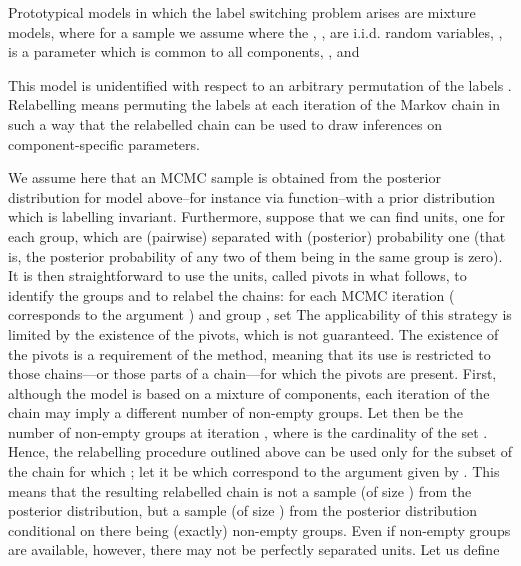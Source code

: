 \documentclass[a4paper]{book}
\begin{document}
\begin{Details}\relax
Prototypical models in which the label switching problem arises are mixture models,
where for a sample  we assume
where the , , are i.i.d. random variables, ,
\eqn{\phi}{} is a parameter which is common to all components,  ,
and

This model is unidentified with respect to an arbitrary permutation of the labels . Relabelling means permuting
the labels at each iteration of the Markov chain in such
a way that the relabelled chain can be used to draw inferences
on component-specific parameters.


We assume here that an MCMC sample is obtained from the
posterior distribution for model above--for instance via
 function--with a prior distribution which is
labelling invariant.
Furthermore, suppose that we can find  units, one
for each group, which are (pairwise) separated with (posterior)
probability one
(that is, the posterior probability of any two of them being
in the same group
is zero).
It is then straightforward to use the  units,
called pivots in what follows, to identify the groups and to
relabel the chains:
for each MCMC iteration  ( corresponds to
the argument ) and group
, set
\deqn{
[\mu_j]_h=[\mu_{[Z_{i_{j}]_h}]}]_h;
}{}
The applicability of this strategy is limited by the existence of the pivots,
which is not guaranteed. The existence of the pivots is a requirement of the
method, meaning that its use is restricted to those chains—or
those parts of a chain—for which the pivots are present. First, although the
model is based on a mixture of  components, each iteration of the chain
may imply a different number of non-empty groups. Let then 
be the number of non-empty groups at iteration ,
where  is the cardinality of the set . Hence, the relabelling
procedure outlined above can be used only for the subset of the chain
for which ; let it be 
which correspond to the argument  given by .
This means that the resulting relabelled chain is not a sample (of size )
from the posterior distribution, but a sample (of size )
from the posterior
distribution conditional on there being (exactly)  non-empty groups.
Even if  non-empty groups are available, however,
there may not be  perfectly separated units. Let us define


\end{Details}
\end{document}
